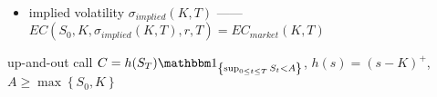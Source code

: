 \begin{itemize}
    \item implied volatility $\sigma_{implied}(K, T)$ ------ $EC(S_0, K, \sigma_{implied}(K, T), r, T) = EC_{market}(K, T)$
\end{itemize}

\begin{example}
    up-and-out call $C = h(S_T)\In_{\left\{ \sup_{0 \leq t \leq T} S_t<A \right\}}$, $h(s) = (s - K)^+$, $A \geq \max\left\{ S_0, K \right\}$
\end{example}

